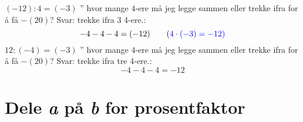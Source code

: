 $ {(-12):4  = (-3)}$ '' hvor mange $ 4 $-ere må jeg legge sammen eller trekke ifra for å få $ -(20) $? Svar: trekke ifra 3 4-ere.:
\[ -4-4-4=(-12) \tag{\color{blue}$ 4\cdot(-3)=-12  $}\]
$ {12:(-4)  = (-3)}$ '' hvor mange $ 4 $-ere må jeg legge sammen eller trekke ifra for å få $ -(20) $? Svar: trekke ifra tre 4-ere.:
\[ -4-4-4=-12 \]
\section*{Dele \textit{a} på \textit{b} for prosentfaktor}


